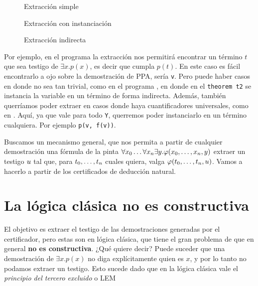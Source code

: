 \begin{multicols}{2}
    \begin{figure}[H]
        
        \caption{Extracción simple}
        \label{fri:prog:exists}
    \end{figure}

    \begin{figure}[H]
        
        \caption{Extracción con instanciación}
        \label{fri:prog:forall}
    \end{figure}
    \begin{figure}[H]
        
        \caption{Extracción indirecta}
        \label{fri:prog:indirect}
    \end{figure}
\end{multicols}

Por ejemplo, en el programa  la extracción nos
permitirá encontrar un término $t$ que sea testigo de $\exists x. p(x)$, es
decir que cumpla $p(t)$. En este caso es fácil encontrarlo a ojo sobre la
demostración de PPA, sería \lstinline{v}. Pero puede haber casos en donde no sea
tan trivial, como en el programa , en donde en el
\lstinline{theorem t2} se instancia la variable en un término de forma
indirecta. Además, también querríamos poder extraer en casos donde haya
cuantificadores universales, como en . Aquí, ya que vale para todo \lstinline{Y}, querremos poder instanciarlo en un término cualquiera. Por ejemplo \lstinline{p(v, f(v))}.

Buscamos un mecanismo general, que nos permita a partir de cualquier
demostración una fórmula de la pinta $\forall x_0 \dots \forall x_n
\exists y . \varphi(x_0, \dots, x_n, y)$ extraer un testigo $u$ tal que, para $t_0, \dots, t_n$ cuales quiera, valga $\varphi(t_0, \dots, t_n, u)$. Vamos a hacerlo a partir
de los certificados de deducción natural.

\section{La lógica clásica no es constructiva}

El objetivo es extraer el testigo de las demostraciones generadas por el
certificador, pero estas son en lógica clásica, que tiene el gran problema de
que en general \textbf{no es constructiva}. ¿Qué quiere decir? Puede suceder que
una demostración de $\exists x . p(x)$ no diga explícitamente quien es $x$, y
por lo tanto no podamos extraer un testigo. Esto sucede dado que en la lógica
clásica vale el \textit{principio del tercero excluido} o LEM

